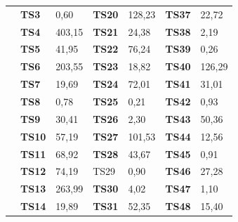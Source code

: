 \begin{table}[]
{\begin{tabular}{|l|l|l|l|l|l|l|}
		& \textbf{TS3}       & 0,60                            & \textbf{TS20}      & 128,23                         & \textbf{TS37}      & 22,72                          \\ \cline{2-7} 
		& \textbf{TS4}       & \cellcolor[HTML]{C0C0C0}403,15  & \textbf{TS21}      & 24,38                          & \textbf{TS38}      & 2,19                           \\ \cline{2-7} 
		& \textbf{TS5}       & 41,95                           & \textbf{TS22}      & 76,24                          & \textbf{TS39}      & 0,26                           \\ \cline{2-7} 
		& \textbf{TS6}       & 203,55                          & \textbf{TS23}      & 18,82                          & \textbf{TS40}      & 126,29                         \\ \cline{2-7} 
		& \textbf{TS7}       & 19,69                           & \textbf{TS24}      & 72,01                          & \textbf{TS41}      & 31,01                          \\ \cline{2-7} 
		& \textbf{TS8}       & 0,78                            & \textbf{TS25}      & 0,21                           & \textbf{TS42}      & 0,93                           \\ \cline{2-7} 
		& \textbf{TS9}       & 30,41                           & \textbf{TS26}      & 2,30                           & \textbf{TS43}      & 50,36                          \\ \cline{2-7} 
		& \textbf{TS10}      & 57,19                           & \textbf{TS27}      & 101,53                         & \textbf{TS44}      & 12,56                          \\ \cline{2-7} 
		& \textbf{TS11}      & 68,92                           & \textbf{TS28}      & 43,67                          & \textbf{TS45}      & 0,91                           \\ \cline{2-7} 
		& \textbf{TS12}      & 74,19                           & TS29               & 0,90                           & \textbf{TS46}      & 27,28                          \\ \cline{2-7} 
		& \textbf{TS13}      & 263,99                          & \textbf{TS30}      & 4,02                           & \textbf{TS47}      & 1,10                           \\ \cline{2-7} 
		& \textbf{TS14}      & 19,89                           & \textbf{TS31}      & 52,35                          & \textbf{TS48}      & 15,40                          \\ \cline{2-7} 

\end{tabular}}
\end{table}

